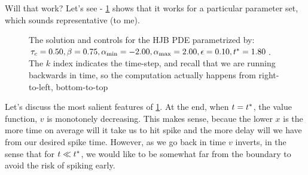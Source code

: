 \documentclass{article}
\begin{document}
Will that work? Let's see - \cref{fig:HJB_attempt} shows that it works for a
particular parameter set, which sounds representative (to me). 
\begin{figure}[ht]
\begin{center}
\caption[]{The solution and controls for the HJB PDE parametrized by:
${ \tau_{c} } = 0.50,  \beta = 0.75,
{ {\alpha}_{\textrm{min}} } = -2.00, { {\alpha}_{\textrm{max}} } = 2.00, {\epsilon}=0.10,
{ t^* } = 1.80$. The $k$ index indicates the time-step, and recall that we are
running backwards in time, so the computation actually happens from right-to-left, bottom-to-top}
\label{fig:HJB_attempt}
\end{center}
\end{figure}


Let's discuss the most salient features of \cref{fig:HJB_attempt}. At the end,
when $t = { t^* }$, the value function, $v$ is monotonely decreasing. This makes
sense, becaue the lower $x$ is the more time on average will it take us to hit spike
and the more delay will we have from our desired spike time. However, as we go
back in time $v$ inverts, in the sense that for $t \ll { t^* }$, we would like to
be somewhat far from the boundary to avoid the risk of spiking early.
\end{document}
